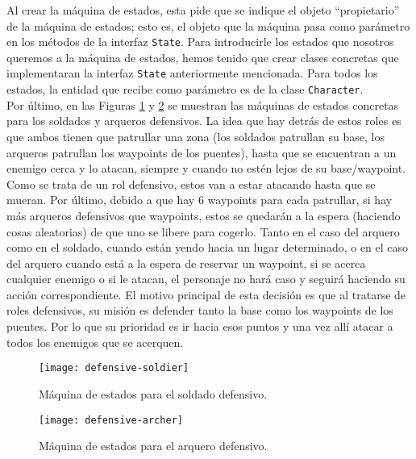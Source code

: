 Al crear la máquina de estados, esta pide que se indique el objeto ``propietario'' de la máquina de estados; esto es, el objeto que la máquina pasa como parámetro en los métodos de la interfaz \texttt{State}. Para introducirle los estados que nosotros queremos a la máquina de estados, hemos tenido que crear clases concretas que implementaran la interfaz \texttt{State} anteriormente mencionada. Para todos los estados, la entidad que recibe como parámetro es de la clase \texttt{Character}. \\

Por último, en las Figuras \ref{defensivos:soldado} y \ref{defensivos:arquero} se muestran las máquinas de estados concretas para los soldados y arqueros defensivos. La idea que hay detrás de estos roles es que ambos tienen que patrullar una zona (los soldados patrullan su base, los arqueros patrullan los waypoints de los puentes), hasta que se encuentran a un enemigo cerca y lo atacan, siempre y cuando no estén lejos de su base/waypoint. Como se trata de un rol defensivo, estos van a estar atacando hasta que se mueran. Por último, debido a que hay 6 waypoints para cada patrullar, si hay más arqueros defensivos que waypoints, estos se quedarán a la espera (haciendo cosas aleatorias) de que uno se libere para cogerlo. Tanto en el caso del arquero como en el soldado, cuando están yendo hacia un lugar determinado, o en el caso del arquero cuando está a la espera de reservar un waypoint, si se acerca cualquier enemigo o si le atacan, el personaje no hará caso y seguirá haciendo su acción correspondiente. El motivo principal de esta decisión es que al tratarse de roles defensivos, su misión es defender tanto la base como los waypoints de los puentes. Por lo que su prioridad es ir hacia esos puntos y una vez allí atacar a todos los enemigos que se acerquen.
\begin{figure}[!th]
\texttt{[image: defensive-soldier]}
\centering
\caption{Máquina de estados para el soldado defensivo.}
\label{defensivos:soldado}
\end{figure}
\begin{figure}[!th]
\texttt{[image: defensive-archer]}
\centering
\caption{Máquina de estados para el arquero defensivo.}
\label{defensivos:arquero}
\end{figure}

